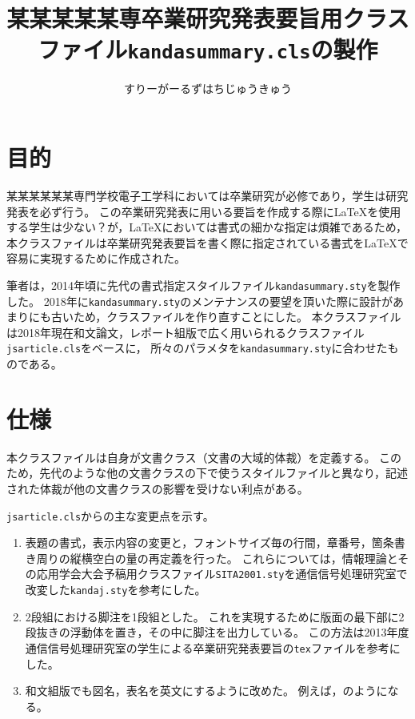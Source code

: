\documentclass{kandasummary}
\begin{document}
\title{某某某某某専卒業研究発表要旨用クラスファイル\texttt{kandasummary.cls}の製作}
\author{すりーがーるずはちじゅうきゅう}
%
%
\maketitle
%
\section{目的}
某某某某某某専門学校電子工学科においては卒業研究が必修であり，学生は研究発表を必ず行う。
この卒業研究発表に用いる要旨を作成する際に\LaTeX{}を使用する学生は少ない？が，\LaTeX{}においては書式の細かな指定は煩雑であるため，
本クラスファイルは卒業研究発表要旨を書く際に指定されている書式を\LaTeX{}で容易に実現するために作成された。

筆者は，2014年頃に先代の書式指定スタイルファイル\texttt{kandasummary.sty}を製作した。
2018年に\texttt{kandasummary.sty}のメンテナンスの要望を頂いた際に設計があまりにも古いため，クラスファイルを作り直すことにした。
本クラスファイルは2018年現在和文論文，レポート組版で広く用いられるクラスファイル\texttt{jsarticle.cls}をベースに，
所々のパラメタを\texttt{kandasummary.sty}に合わせたものである。

\section{仕様}
本クラスファイルは自身が文書クラス（文書の大域的体裁）を定義する。
このため，先代のような他の文書クラスの下で使うスタイルファイルと異なり，記述された体裁が他の文書クラスの影響を受けない利点がある。

\texttt{jsarticle.cls}からの主な変更点を示す。

\begin{enumerate}
\item 
表題の書式，表示内容の変更と，フォントサイズ毎の行間，章番号，箇条書き周りの縦横空白の量の再定義を行った。
これらについては，情報理論とその応用学会大会予稿用クラスファイル\texttt{SITA2001.sty}を通信信号処理研究室で改変した\texttt{kandaj.sty}を参考にした。
\item
2段組における脚注を1段組とした。
これを実現するために版面の最下部に2段抜きの浮動体を置き，その中に脚注を出力している。
この方法は2013年度通信信号処理研究室の学生による卒業研究発表要旨の\texttt{tex}ファイルを参考にした。
\item
和文組版でも図名，表名を英文にするように改めた。
例えば，のようになる。
\end{enumerate}
\end{document}
